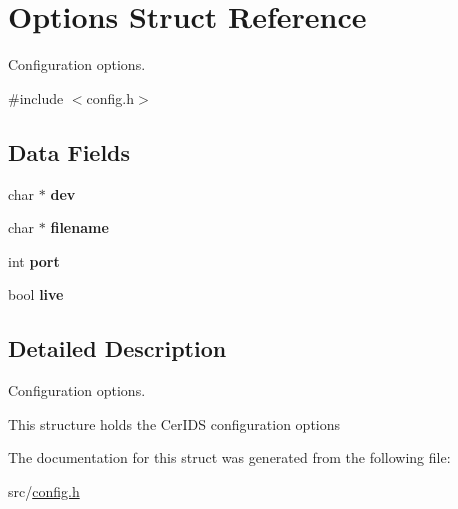 \hypertarget{structOptions}{}\section{Options Struct Reference}
\label{structOptions}


Configuration options.  




{\ttfamily \#include $<$config.\+h$>$}

\subsection*{Data Fields}
\begin{DoxyCompactItemize}
\item 
\hypertarget{structOptions_a3a0af54c402856ad8f11838e7f3bb11b}{}char $\ast$ {\bfseries dev}\label{structOptions_a3a0af54c402856ad8f11838e7f3bb11b}

\item 
\hypertarget{structOptions_abec9a4fd2d6133bae143de5d15f58b8f}{}char $\ast$ {\bfseries filename}\label{structOptions_abec9a4fd2d6133bae143de5d15f58b8f}

\item 
\hypertarget{structOptions_a103e2917153e128156c87f6c0b030aac}{}int {\bfseries port}\label{structOptions_a103e2917153e128156c87f6c0b030aac}

\item 
\hypertarget{structOptions_a8358c04f269bd9938db9cfc3b148c157}{}bool {\bfseries live}\label{structOptions_a8358c04f269bd9938db9cfc3b148c157}

\end{DoxyCompactItemize}


\subsection{Detailed Description}
Configuration options. 

This structure holds the Cer\+I\+D\+S configuration options 

The documentation for this struct was generated from the following file\+:\begin{DoxyCompactItemize}
\item 
src/\hyperlink{config_8h}{config.\+h}\end{DoxyCompactItemize}
